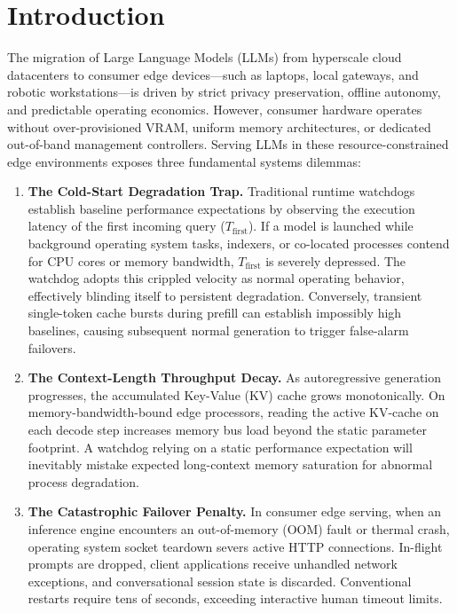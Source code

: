 \documentclass[11pt,a4paper]{article}
\newcommand{\Tfirst}{T_{\mathrm{first}}}
\begin{document}
\section{Introduction}
The migration of Large Language Models (LLMs) from hyperscale cloud datacenters to consumer edge devices---such as laptops, local gateways, and robotic workstations---is driven by strict privacy preservation, offline autonomy, and predictable operating economics. However, consumer hardware operates without over-provisioned VRAM, uniform memory architectures, or dedicated out-of-band management controllers. Serving LLMs in these resource-constrained edge environments exposes three fundamental systems dilemmas:

\begin{enumerate}[leftmargin=*]
\item \textbf{The Cold-Start Degradation Trap.} Traditional runtime watchdogs establish baseline performance expectations by observing the execution latency of the first incoming query ($\Tfirst$). If a model is launched while background operating system tasks, indexers, or co-located processes contend for CPU cores or memory bandwidth, $\Tfirst$ is severely depressed. The watchdog adopts this crippled velocity as normal operating behavior, effectively blinding itself to persistent degradation. Conversely, transient single-token cache bursts during prefill can establish impossibly high baselines, causing subsequent normal generation to trigger false-alarm failovers.
\item \textbf{The Context-Length Throughput Decay.} As autoregressive generation progresses, the accumulated Key-Value (KV) cache grows monotonically. On memory-bandwidth-bound edge processors, reading the active KV-cache on each decode step increases memory bus load beyond the static parameter footprint. A watchdog relying on a static performance expectation will inevitably mistake expected long-context memory saturation for abnormal process degradation.
\item \textbf{The Catastrophic Failover Penalty.} In consumer edge serving, when an inference engine encounters an out-of-memory (OOM) fault or thermal crash, operating system socket teardown severs active HTTP connections. In-flight prompts are dropped, client applications receive unhandled network exceptions, and conversational session state is discarded. Conventional restarts require tens of seconds, exceeding interactive human timeout limits.
\end{enumerate}
\end{document}

